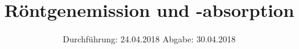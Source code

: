 

\subject{602}
\title{Röntgenemission und -absorption}
\date{%
  Durchführung: 24.04.2018
  \hspace{3em}
  Abgabe: 30.04.2018
}



\maketitle
\thispagestyle{empty}
\tableofcontents
\newpage






\printbibliography{}


